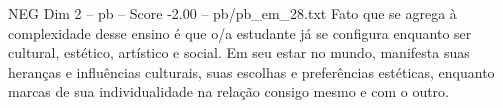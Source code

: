 \begin{textsample}{NEG Dim 2 – pb – Score -2.00 – pb/pb\_em\_28.txt}
Fato que se agrega à complexidade desse ensino é que o/a estudante já se configura enquanto ser cultural, estético, artístico e social.
Em seu estar no mundo, manifesta suas heranças e influências culturais, suas escolhas e preferências estéticas, enquanto marcas de sua individualidade na relação consigo mesmo e com o outro.

\end{textsample}
